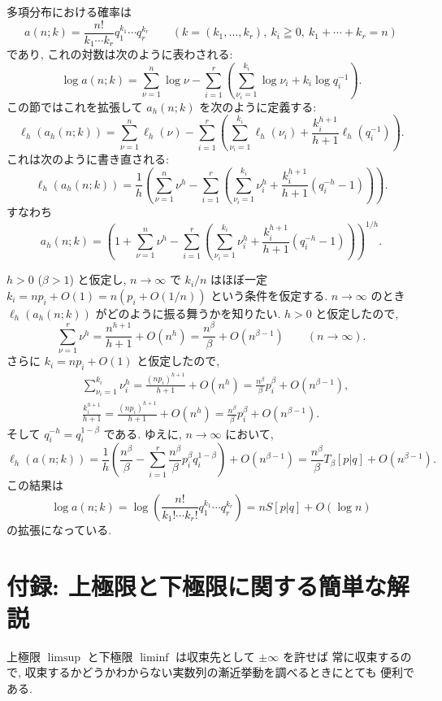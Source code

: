 \documentclass[12pt,twoside]{jarticle}
\theoremstyle{definition} %
\theoremstyle{definition} %
\theoremstyle{definition} %
\numberwithin{theorem}{section}
\numberwithin{equation}{section}
\numberwithin{figure}{section}
\numberwithin{table}{section}
\begin{document}
多項分布における確率は
\[
a(n;k)=\frac{n!}{k_1\cdots k_r}q_1^{k_1}\cdots q_r^{k_r}
\qquad \left(k=(k_1,\ldots,k_r),\ k_i\geqq 0,\ k_1+\cdots+k_r=n\right)
\]
であり, これの対数は次のように表わされる:
\[
\log a(n;k)
=\sum_{\nu=1}^n\log\nu 
-\sum_{i=1}^r \left(
   \sum_{\nu_i=1}^{k_i} \log\nu_i
  +k_i\log q_i^{-1}
 \right).
\]
この節ではこれを拡張して $a_h(n;k)$ を次のように定義する:
\[
\ell_h(a_h(n;k))
=\sum_{\nu=1}^n \ell_h(\nu)
-\sum_{i=1}^r \left(
   \sum_{\nu_i=1}^{k_i} \ell_h(\nu_i)
  +\frac{k_i^{h+1}}{h+1}\ell_h(q_i^{-1})
\right).
\]
これは次のように書き直される:
\[
\ell_h(a_h(n;k))
=\frac{1}{h}\left(
   \sum_{\nu=1}^n \nu^h
  -\sum_{i=1}^r\left(
      \sum_{\nu_i=1}^{k_i} \nu_i^h
     +\frac{k_i^{h+1}}{h+1}(q_i^{-h}-1)
   \right)
\right).
\]
すなわち
\[
a_h(n;k)
=\left(
   1
  +\sum_{\nu=1}^n \nu^h
  -\sum_{i=1}^r\left(
      \sum_{\nu_i=1}^{k_i} \nu_i^h
     +\frac{k_i^{h+1}}{h+1}(q_i^{-h}-1)
   \right)
\right)^{1/h}.
\]

$h>0$ ($\beta>1$) と仮定し, 
$n\to\infty$ で $k_i/n$ はほぼ一定 $k_i=n p_i + O(1)=n(p_i+O(1/n))$ という条件を仮定する.
$n\to\infty$ のとき $\ell_h(a_h(n;k))$ がどのように振る舞うかを知りたい.
$h>0$ と仮定したので, 
\[
\sum_{\nu=1}^r \nu^h 
= \frac{n^{h+1}}{h+1} + O(n^h)
= \frac{n^\beta}{\beta} + O(n^{\beta-1})
\qquad (n\to\infty).
\]
さらに $k_i=np_i+O(1)$ と仮定したので, 
\begin{align*}
&
\sum_{\nu_i=1}^{k_i}\nu_i^h 
= \frac{(np_i)^{h+1}}{h+1} + O(n^h)
= \frac{n^\beta}{\beta}p_i^\beta+ O(n^{\beta-1}),
\\ &
\frac{k_i^{h+1}}{h+1}
= \frac{(np_i)^{h+1}}{h+1} + O(n^h)
= \frac{n^\beta}{\beta}p_i^\beta+ O(n^{\beta-1}).
\end{align*}
そして $q_i^{-h}=q_i^{1-\beta}$ である.
ゆえに, $n\to\infty$ において, 
\[
\ell_h(a(n;k))
=\frac{1}{h}\left(
 \frac{n^\beta}{\beta}-\sum_{i=1}^r \frac{n^\beta}{\beta}p_i^\beta q_i^{1-\beta}
\right) + O(n^{\beta-1})
=\frac{n^\beta}{\beta}T_\beta[p|q] + O(n^{\beta-1}).
\]
この結果は
\[
\log a(n;k)
= \log\left( \frac{n!}{k_1!\cdots k_r!}q_1^{k_1}\cdots q_r^{k_r} \right)
= n S[p|q] + O(\log n)
\]
の拡張になっている.


\section{付録: 上極限と下極限に関する簡単な解説}
\label{sec:limsup}

上極限 $\limsup$ と下極限 $\liminf$ は収束先として $\pm\infty$ を許せば
常に収束するので, 収束するかどうかわからない実数列の漸近挙動を調べるときにとても
便利である. 
\end{document}
